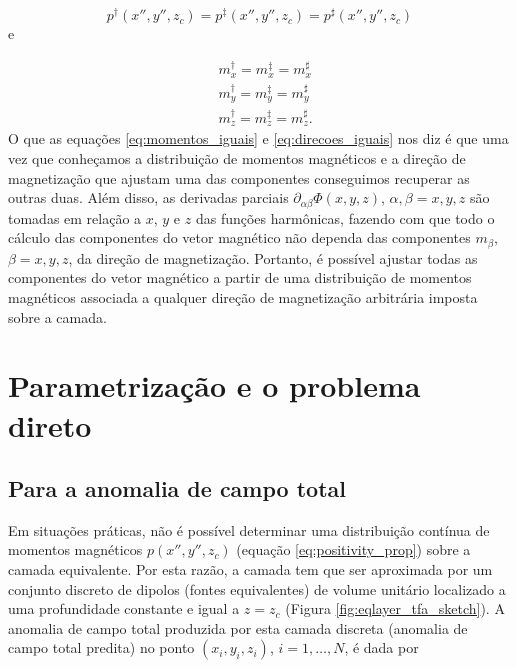 \begin{equation}
p^{\dagger}(x'', y'', z_{c}) = p^{\ddagger}(x'', y'', z_{c}) = p^{\sharp}(x'', y'', z_{c})
\label{eq:momentos_iguais}
\end{equation}
e 

\begin{equation}
\begin{split}
&m_{x}^{\dagger} = m_{x}^{\ddagger} = m_{x}^{\sharp} 
\\
&m_{y}^{\dagger} = m_{y}^{\ddagger} = m_{y}^{\sharp} 
\\
&m_{z}^{\dagger} = m_{z}^{\ddagger} = m_{z}^{\sharp}.
\end{split}
\label{eq:direcoes_iguais}
\end{equation}
O que as equações \ref{eq:momentos_iguais} e \ref{eq:direcoes_iguais} nos diz é que uma vez que conheçamos a distribuição de momentos magnéticos e a direção de magnetização que ajustam uma das componentes conseguimos recuperar as outras duas. Além disso, as derivadas parciais $\partial_{\alpha\beta} \Phi(x, y, z)$, $\alpha, \beta = x, y, z$ são tomadas em relação a $x$, $y$ e $z$ das funções harmônicas, fazendo com que todo o cálculo das componentes do vetor magnético não dependa das componentes $m_\beta$, $\beta = x,y,z$, da direção de magnetização. Portanto, é possível ajustar todas as componentes do vetor magnético a partir de uma distribuição de momentos magnéticos associada a qualquer direção de magnetização arbitrária imposta sobre a camada.  
 
\section{Parametrização e o problema direto}
\label{sec:par_prob_dir}

\subsection{Para a anomalia de campo total}
\label{subsec:tf_prob_dir}

Em situações práticas, não é possível determinar uma distribuição contínua de momentos magnéticos $p(x'',y'',z_{c})$ (equação \ref{eq:positivity_prop}) sobre a camada equivalente. Por esta razão, a camada tem que ser aproximada por um conjunto discreto de dipolos (fontes equivalentes) de volume unitário localizado a uma profundidade constante e igual a $z = z_c$ (Figura \ref{fig:eqlayer_tfa_sketch}). A anomalia de campo total produzida por esta camada discreta (anomalia de campo total predita) no ponto $(x_i,y_i,z_i)$, $i=1,\dots,N$, é dada por 

